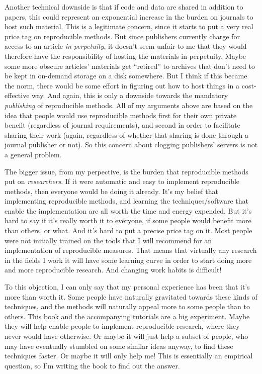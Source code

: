 \documentclass{book}
\begin{document}
Another technical downside is that if code and data are shared in addition to papers, this could represent an exponential increase in the burden on journals to host such material. This is a legitimate concern, since it starts to put a very real price tag on reproducible methods.  But since publishers currently charge for access to an article \emph{in perpetuity}, it doesn't seem unfair to me that they would therefore have the responsibility of hosting the materials in perpetuity.  Maybe some more obscure articles' materials get ``retired'' to archives that don't need to be kept in on-demand storage on a disk somewhere.  But I think if this became the norm, there would be some effort in figuring out how to host things in a cost-effective way.  And again, this is only a downside towards the mandatory \emph{publishing} of reproducible methods.  All of my arguments above are based on the idea that people would use reproducible methods first for their own private benefit (regardless of journal requirements), and second in order to facilitate sharing their work (again, regardless of whether that sharing is done through a journal publisher or not). So this concern about clogging publishers' servers is not a general problem.

The bigger issue, from my perpective, is the burden that reproducible methods put on \emph{researchers}. If it were automatic and easy to implement reproducible methods, then everyone would be doing it already. It's my belief that implementing reproducible methods, and learning the techniques/software that enable the implementation are all worth the time and energy expended. But it's hard to say if it's really worth it to everyone, if some people would benefit more than others, or what.  And it's hard to put a precise price tag on it.  Most people were not initially trained on the tools that I will recommend for an implementation of reproducible measures. That means that virtually any research in the fields I work it will have some learning curve in order to start doing more and more reproducible research. And changing work habits is difficult!

To this objection, I can only say that my personal experience has been that it's more than worth it. Some people have naturally gravitated towards these kinds of techniques, and the methods will naturally appeal more to some people than to others. This book and the accompanying tutorials are a big experiment. Maybe they will help enable people to implement reproducible research, where they never would have otherwise. Or maybe it will just help a subset of people, who may have eventually stumbled on some similar ideas anyway, to find these techniques faster. Or maybe it will only help me!  This is essentially an empirical question, so I'm writing the book to find out the answer.
\end{document}
